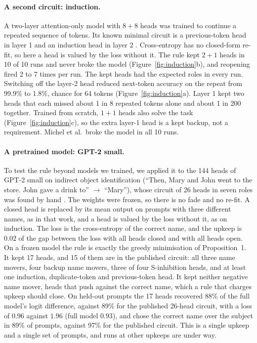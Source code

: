 \documentclass[letterpaper]{article} %
\begin{document}
\paragraph{A second circuit: induction.} A two-layer attention-only model with $8+8$ heads was trained to continue a repeated sequence of tokens. Its known minimal circuit is a previous-token head in layer 1 and an induction head in layer 2 \citep{olsson2022}. Cross-entropy has no closed-form re-fit, so here a head is valued by the loss without it. The rule kept $2+1$ heads in 10 of 10 runs and never broke the model (Figure~\ref{fig:induction}b), and reopening fired 2 to 7 times per run. The kept heads had the expected roles in every run. Switching off the layer-2 head reduced next-token accuracy on the repeat from 99.9\% to 1.8\%, chance for 64 tokens (Figure~\ref{fig:induction}a). Layer 1 kept two heads that each missed about 1 in 8 repeated tokens alone and about 1 in 200 together. Trained from scratch, $1+1$ heads also solve the task (Figure~\ref{fig:induction}c), so the extra layer-1 head is a kept backup, not a requirement. Michel et al.\ broke the model in all 10 runs.

\paragraph{A pretrained model: GPT-2 small.} To test the rule beyond models we trained, we applied it to the 144 heads of GPT-2 small on indirect object identification (``Then, Mary and John went to the store. John gave a drink to'' $\to$ ``Mary''), whose circuit of 26 heads in seven roles was found by hand \citep{wang2023interpretability}. The weights were frozen, so there is no fade and no re-fit. A closed head is replaced by its mean output on prompts with three different names, as in that work, and a head is valued by the loss without it, as on induction. The loss is the cross-entropy of the correct name, and the upkeep is $0.02$ of the gap between the loss with all heads closed and with all heads open. On a frozen model the rule is exactly the greedy minimisation of Proposition~1. It kept 17 heads, and 15 of them are in the published circuit: all three name movers, four backup name movers, three of four S-inhibition heads, and at least one induction, duplicate-token and previous-token head. It kept neither negative name mover, heads that push against the correct name, which a rule that charges upkeep should close. On held-out prompts the 17 heads recovered 88\% of the full model's logit difference, against 89\% for the published 26-head circuit, with a loss of $0.96$ against $1.96$ (full model $0.93$), and chose the correct name over the subject in 89\% of prompts, against 97\% for the published circuit. This is a single upkeep and a single set of prompts, and runs at other upkeeps are under way.
\end{document}
